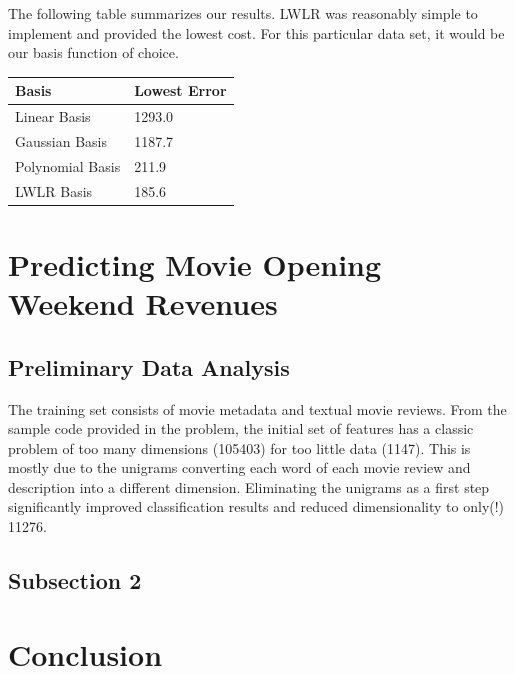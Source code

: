\documentclass[11pt, oneside]{article}   	%
\begin{document}
The following table summarizes our results. LWLR was reasonably simple to implement and provided the lowest cost. For this particular data set, it would be our basis function of choice.

\begin{center}
    \begin{tabular}{| l | l |}
    \hline
    Basis & Lowest Error \\ \hline
    Linear Basis & \hfill 1293.0 \\
    Gaussian Basis & \hfill 1187.7 \\
    Polynomial Basis & \hfill 211.9 \\
    LWLR Basis & \hfill 185.6 \\
    \hline
    \end{tabular}
\end{center}


\section*{Predicting Movie Opening Weekend Revenues}


\subsection*{Preliminary Data Analysis}

The training set consists of movie metadata and textual movie reviews. From the sample code provided in the problem, the initial set of features has a classic problem of too many dimensions (105403) for too little data (1147).  This is mostly due to the unigrams converting each word of each movie review and description into a different dimension. Eliminating the unigrams as a first step significantly improved classification results and reduced dimensionality to only(!) 11276.

\subsection*{Subsection 2}

\section*{Conclusion}
\end{document}
